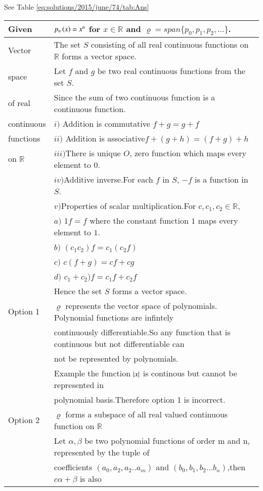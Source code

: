 See Table     \ref{eq:solutions/2015/june/74/tab:Ans}

\onecolumn
\begin{longtable}{|l|l|}
    \hline
    Given & $p_n\left(x\right)=x^n$ for $x\in\mathbb{R}$ and $\varrho=span\{p_0,p_1,p_2,...\}$.\\
    \hline
    Vector& The set $S$ consisting of all real continuous functions on $\mathbb{R}$ forms a vector space.\\
    space&Let $f$ and $g$ be two real continuous functions from the set $S$.\\
    of real&Since the sum of two continuous function is a continuous function.\\
    continuous&$i)$ Addition is commutative $f+g=g+f$\\
    functions&$ii)$ Addition is associative$f+(g+h)=(f+g)+h$\\
    on $\mathbb{R}$&$iii)$There is unique $O$, zero function which maps every element to 0.\\
    &$iv)$Additive inverse.For each $f$ in $S$, $-f$ is a function in $S$.\\
    &$v)$Properties of scalar multiplication.For $c,c_1,c_2\in \mathbb{R}$,\\
    &\qquad $a)$ $1f=f$ where the constant function $1$ maps every element to $1$.\\
    &\qquad $b)$ $(c_1c_2)f=c_1(c_2f)$\\
    &\qquad $c)$ $c(f+g)=cf+cg$\\
    &\qquad $d)$ $c_1+c_2)f=c_1f+c_2f$\\
    &Hence the set $S$ forms a vector space.\\
    \hline
    Option 1& $\varrho$ represents the vector space of polynomials. Polynomial functions are infintely \\
    & continuously differentiable.So any function that is continuous but not differentiable can \\
    & not be represented by polynomials.\\
    & Example the function $\left\vert x\right\vert$ is continous but cannot be represented in \\
    &polynomial basis.Therefore option 1 is incorrect.\\
    \hline
    Option 2& $\varrho$ forms a subspace of all real valued continuous function on $\mathbb{R}$\\
    &Let $\alpha,\beta$ be two polynomial functions of order m and n, represented by the tuple of\\ &coefficients $(a_0,a_2,a_2..a_m)$ and $(b_0,b_1,b_2...b_n)$,then $c\alpha+\beta$ is also\\

\end{longtable}
